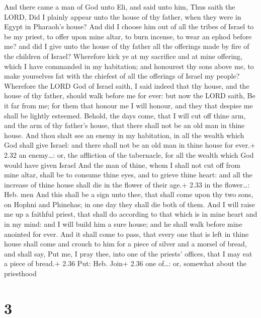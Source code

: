  And there came a man of God unto Eli, and said unto him,
Thus saith the LORD, Did I plainly appear unto the house of thy father,
when they were in Egypt in Pharaoh's house?  And did I
choose him out of all the tribes of Israel to be my priest, to offer
upon mine altar, to burn incense, to wear an ephod before me? and did I
give unto the house of thy father all the offerings made by fire of the
children of Israel?  Wherefore kick ye at my sacrifice and
at mine offering, which I have commanded in my habitation; and honourest
thy sons above me, to make yourselves fat with the chiefest of all the
offerings of Israel my people?  Wherefore the LORD God of
Israel saith, I said indeed that thy house, and the house of thy father,
should walk before me for ever: but now the LORD saith, Be it far from
me; for them that honour me I will honour, and they that despise me
shall be lightly esteemed.  Behold, the days come, that I
will cut off thine arm, and the arm of thy father's house, that there
shall not be an old man in thine house.  And thou shalt see
an enemy in my habitation, in all the wealth which God shall give
Israel: and there shall not be an old man in thine house for ever.+ 2.32
an enemy\ldots: or, the affliction of the tabernacle, for all the wealth
which God would have given Israel  And the man of thine,
whom I shall not cut off from mine altar, shall be to consume thine
eyes, and to grieve thine heart: and all the increase of thine house
shall die in the flower of their age.+ 2.33 in the flower\ldots: Heb.
men  And this shall be a sign unto thee, that shall come
upon thy two sons, on Hophni and Phinehas; in one day they shall die
both of them.  And I will raise me up a faithful priest,
that shall do according to that which is in mine heart and in my mind:
and I will build him a sure house; and he shall walk before mine
anointed for ever.  And it shall come to pass, that every
one that is left in thine house shall come and crouch to him for a piece
of silver and a morsel of bread, and shall say, Put me, I pray thee,
into one of the priests' offices, that I may eat a piece of bread.+ 2.36
Put: Heb. Join+ 2.36 one of\ldots: or, somewhat about the priesthood

\hypertarget{section-2}{%
\section{3}\label{section-2}}

